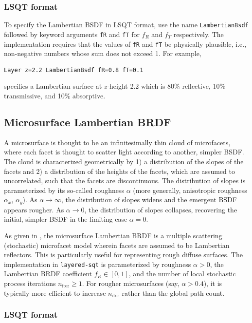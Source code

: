 \documentclass[
    twoside,
    twocolumn,
    letterpaper,
    10pt]{article}
\begin{document}
\subsubsection{LSQT format}

To specify the Lambertian BSDF in LSQT format, use the name
\texttt{LambertianBsdf} followed by keyword arguments \texttt{fR}
and \texttt{fT} for $f_R$ and $f_T$ respectively. The implementation
requires that the values of \texttt{fR} and \texttt{fT} be physically
plausible, i.e., non-negative numbers whose sum does not exceed 1.
For example,
\begin{verbatim}
Layer z=2.2 LambertianBsdf fR=0.8 fT=0.1
\end{verbatim}
specifies a Lambertian surface at $z$-height 2.2 which is 80\% reflective,
10\% transmissive, and 10\% absorptive. 

\subsection{Microsurface Lambertian BRDF}

A microsurface is thought 
to be an infinitesimally thin cloud of microfacets, where each facet 
is thought to scatter light according to another, simpler BSDF. The 
cloud is characterized geometrically by 1) a distribution of the
slopes of the facets and 2) a distribution of the heights of the facets,
which are assumed to uncorrelated, such that the facets are discontinuous. 
The distribution of slopes is parameterized by its so-called roughness
$\alpha$ (more generally, anisotropic roughness $\alpha_x$, $\alpha_y$).
As $\alpha\to\infty$, the distribution of slopes widens and the emergent
BSDF appears rougher. As $\alpha\to0$, the distribution of slopes collapses,
recovering the initial, simpler BSDF in the limiting case $\alpha=0$.

As given in \cite{Heitz:16},
the microsurface Lambertian BRDF is a multiple scattering (stochastic)
microfacet model wherein facets are assumed to be Lambertian reflectors. 
This is particularly useful for representing rough diffuse surfaces. The 
implementation in \texttt{layered-sqt} is parameterized by
roughness $\alpha>0$, the Lambertian BRDF coefficient 
$f_R \in [0,1]$, and the number of local stochastic process 
iterations $n_{\text{iter}} \ge 1$. For rougher microsurfaces 
(say, $\alpha > 0.4$), it is typically more efficient to increase 
$n_{\text{iter}}$ rather than the global path count.

\subsubsection{LSQT format}
\end{document}
